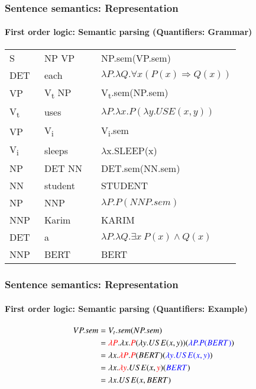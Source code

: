 \documentclass[xcolor=table]{beamer}
\begin{document}
\begin{frame}
	\frametitle{Sentence semantics: Representation}
	\framesubtitle{First order logic: Semantic parsing (Quantifiers: Grammar)}
	
	\begin{center}
		\small\bfseries
		\begin{tabular}{llll}
			\hline\hline
			S  & \textrightarrow\ NP VP && NP.sem(VP.sem) \\
			DET & \textrightarrow\ each && $\lambda P.\lambda Q.\forall x (P(x) \Rightarrow Q(x))$ \\
			
			VP & \textrightarrow\ V\textsubscript{t} NP && V\textsubscript{t}.sem(NP.sem) \\
			V\textsubscript{t}  & \textrightarrow\ uses && $\lambda P.\lambda x.P(\lambda y.USE(x, y))$ \\
			
			VP & \textrightarrow\ V\textsubscript{i} && V\textsubscript{i}.sem \\
			V\textsubscript{i}  & \textrightarrow\ sleeps && $ \lambda $x.SLEEP(x) \\
			
			NP & \textrightarrow\ DET NN && DET.sem(NN.sem) \\
			NN  & \textrightarrow\  student && STUDENT \\
			
			NP & \textrightarrow\ NNP && $\lambda P.P(NNP.sem)$ \\
			NNP  & \textrightarrow\  Karim && KARIM \\
			
			DET & \textrightarrow\ a && $\lambda P.\lambda Q.\exists x\ P(x) \wedge Q(x)$ \\
			NNP  & \textrightarrow\  BERT && BERT \\
			\hline\hline
		\end{tabular}
	\end{center}

\end{frame}

\begin{frame}
	\frametitle{Sentence semantics: Representation}
	\framesubtitle{First order logic: Semantic parsing (Quantifiers: Example)}
	
	
	\begin{center}
		\small
		\begin{align*}
		VP.sem & = V_t.sem(NP.sem) \\
		& = \textcolor{red}{\lambda P}.\lambda x.\textcolor{red}{P}(\lambda y.USE(x, y))(\textcolor{blue}{\lambda P.P(BERT)}) \\
		& = \lambda x.\textcolor{red}{\lambda P}.\textcolor{red}{P}(BERT)(\textcolor{blue}{\lambda y.USE(x, y)}) \\
		& = \lambda x.\textcolor{red}{\lambda y}.USE(x, \textcolor{red}{y})(\textcolor{blue}{BERT}) \\
		& = \lambda x.USE(x, BERT) \\
		\end{align*}
	\end{center}
	
\end{frame}
\end{document}
